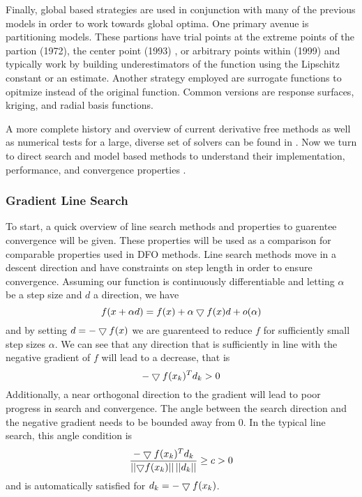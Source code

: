 Finally, global based strategies are used in conjunction with many of the previous models in order to work towards global optima. One primary avenue is partitioning models.  These partions have trial points at the extreme points of the partion (1972)\cite{shubert_1972}, the center point (1993) \cite{jones_1993}, or arbitrary points within (1999) \cite{huyer_1999} and typically work by building underestimators of the function using the Lipschitz constant or an estimate.  Another strategy employed are surrogate functions to opitmize instead of the original function.  Common versions are response surfaces, kriging, and radial basis functions.  

A more complete history and overview of current derivative free methods as well as numerical tests for a large, diverse set of solvers can be found in \cite{rios_2013}.  Now we turn to direct search and model based methods to understand their implementation, performance, and convergence properties .


\subsubsection*{Gradient Line Search}
To start, a quick overview of line search methods and properties to guarentee convergence will be given.  These properties will be used as a comparison for comparable properties used in DFO methods.  Line search methods move in a descent direction and have constraints on step length in order to ensure convergence.  Assuming our function is continuously differentiable and letting $\alpha$ be a step size and $d$ a direction, we have
\begin{equation}
f(x + \alpha d ) = f(x) + \alpha \bigtriangledown f(x) d  + o (\alpha)
\end{equation}
and by setting $d = -\bigtriangledown f(x)$ we are guarenteed to reduce $f$ for sufficiently small step sizes $\alpha$.  We can see that any direction that is sufficiently in line with the negative gradient of $f$ will lead to a decrease, that is
\begin{equation}
-\bigtriangledown f(x_k)^T d_k > 0
\end{equation}
Additionally, a near orthogonal direction to the gradient will lead to poor progress in search and convergence.  The angle between the search direction and the negative gradient needs to be bounded away from 0.  In the typical line search, this angle condition is
\begin{equation}
\frac{-\bigtriangledown f(x_k)^T d_k}{\left| \left| {\bigtriangledown f(x_k) } \right| \right| \left| \left| {d_k} \right| \right|} \geq c > 0
\end{equation}
and is automatically satisfied for $d_k = -\bigtriangledown f(x_k)$.

